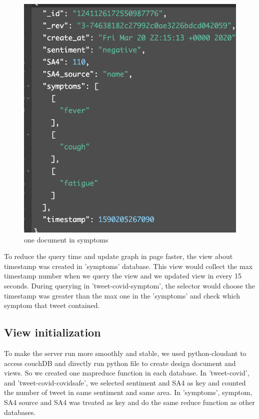 \begin{figure}[H]
    \centering
    \includegraphics[scale=0.4]{city_analytics/report/images/symptomsdb.png}
    \caption{one document in symptoms}
    \label{fig:my_label}
\end{figure}

To reduce the query time and update graph in page faster, the view about timestamp was created in 'symptoms' database. This view would collect the max timestamp number when we query the view and we updated view in every 15 seconds. During querying in 'tweet-covid-symptom', the selector would choose the timestamp was greater than the max one in the 'symptoms' and check which symptom that tweet contained. 

\subsection{View initialization}

To make the server run more smoothly and stable, we used python-cloudant to access couchDB and directly run python file to create design document and views. So we created one mapreduce function in each database. In 'tweet-covid', and 'tweet-covid-covidsafe', we selected sentiment and SA4 as key and counted the number of tweet in same sentiment and same area. In 'symptoms', symptom, SA4 source and SA4 was treated as key and do the same reduce function as other databases. 


